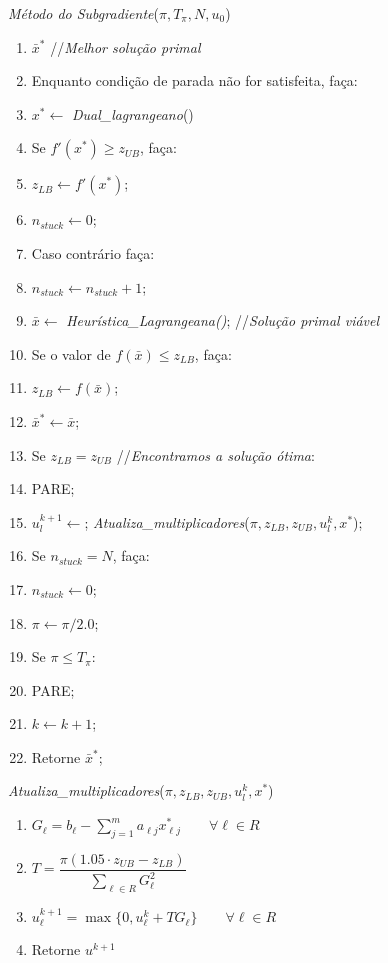 \documentclass[12pt]{article}
\begin{document}
\emph{Método do Subgradiente}($\pi, T_\pi, N, u_0$)

\begin{enumerate}
 \setlength{\itemsep}{0.7pt}
\item $\bar x^*$ //\emph{Melhor solução primal}
\item Enquanto condição de parada não for satisfeita, faça:
\item \qquad $x^* \leftarrow$ \emph{Dual\_lagrangeano}()
\item \qquad Se $f'(x^*) \ge z_{UB}$, faça:
\item \qquad \qquad $z_{LB} \leftarrow f'(x^*)$;
\item \qquad \qquad $n_{stuck} \leftarrow 0$;
\item \qquad Caso contrário faça:
\item \qquad \qquad $n_{stuck} \leftarrow n_{stuck} + 1$;
\item \qquad $\bar x \leftarrow$ \emph{Heurística\_Lagrangeana()};
  //\emph{Solução primal viável}
\item \qquad Se o valor de $f(\bar x) \le z_{LB}$, faça: 
\item \qquad \qquad $z_{LB} \leftarrow f(\bar x)$;
\item \qquad \qquad $\bar x^* \leftarrow \bar x$;
\item \qquad Se $z_{LB} = z_{UB}$ //\emph{Encontramos a solução ótima}: 
\item \qquad \qquad PARE;
\item \qquad $u_l^{k + 1} \leftarrow$;
  \emph{Atualiza\_multiplicadores}($\pi, z_{LB}, z_{UB}, u_l^{k}, x^*$);
\item \qquad Se $n_{stuck} = N$, faça:
\item \qquad \qquad $n_{stuck} \leftarrow 0$;
\item \qquad \qquad $\pi \leftarrow \pi / 2.0$;
\item \qquad \qquad Se $\pi \le T_\pi$:
\item \qquad \qquad \qquad PARE;
\item \qquad $k \leftarrow k + 1$;
\item Retorne $\bar x^*$;

\end{enumerate}

\clearpage

\emph{Atualiza\_multiplicadores}($\pi, z_{LB}, z_{UB}, u_l^{k}, x^*$) 

\begin{enumerate}
\item $G_\ell = b_\ell - \sum_{j = 1}^m a_{\ell j} x^*_{\ell j} \qquad \forall \ell \in R$
\item $T = \dfrac{\pi(1.05 \cdot z_{UB} - z_{LB})}{\sum_{\ell \in R} G_\ell^2}$
\item $u^{k + 1}_\ell = \max \{ 0, u^{k}_\ell + TG_\ell \}  \qquad
  \forall \ell \in R$
\item Retorne $u^{k + 1}$
\end{enumerate}



 
 
\end{document}
